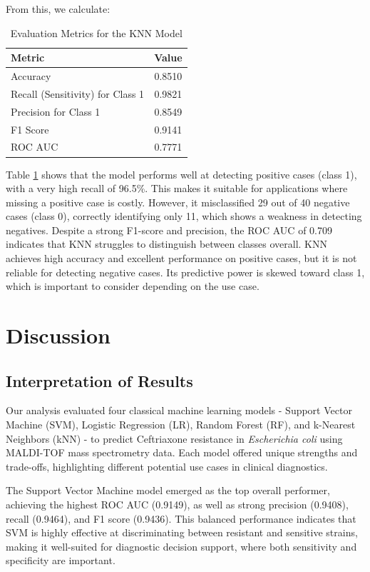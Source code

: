 \documentclass{article}
\begin{document}
From this, we calculate:

\begin{table}[h!]
\centering
\caption{Evaluation Metrics for the KNN Model}
\label{tab:evaluation_metrics_class1}
\begin{tabular}{|l|c|}
\hline
\textbf{Metric} & \textbf{Value} \\
\hline
Accuracy  & 0.8510 \\
Recall (Sensitivity) for Class 1 & 0.9821 \\
Precision for Class 1 & 0.8549 \\
F1 Score  & 0.9141 \\
ROC AUC   & 0.7771 \\
\hline
\end{tabular}
\end{table}

Table \ref{tab:evaluation_metrics_class1} shows that the model performs well at detecting positive cases (class 1), with a very high recall of 96.5\%. This makes it suitable for applications where missing a positive case is costly.
However, it misclassified 29 out of 40 negative cases (class 0), correctly identifying only 11, which shows a weakness in detecting negatives.
Despite a strong F1-score and precision, the ROC AUC of 0.709 indicates that KNN struggles to distinguish between classes overall.
KNN achieves high accuracy and excellent performance on positive cases, but it is not reliable for detecting negative cases. Its predictive power is skewed toward class 1, which is important to consider depending on the use case. \citep{ibm-knn}


\section{Discussion}

\subsection{Interpretation of Results}

Our analysis evaluated four classical machine learning models - Support Vector Machine (SVM), Logistic Regression (LR), Random Forest (RF), and k-Nearest Neighbors (kNN) - to predict Ceftriaxone resistance in \textit{Escherichia coli} using MALDI-TOF mass spectrometry data. Each model offered unique strengths and trade-offs, highlighting different potential use cases in clinical diagnostics.

The Support Vector Machine model emerged as the top overall performer, achieving the highest ROC AUC (0.9149), as well as strong precision (0.9408), recall (0.9464), and F1 score (0.9436). This balanced performance indicates that SVM is highly effective at discriminating between resistant and sensitive strains, making it well-suited for diagnostic decision support, where both sensitivity and specificity are important.
\end{document}
